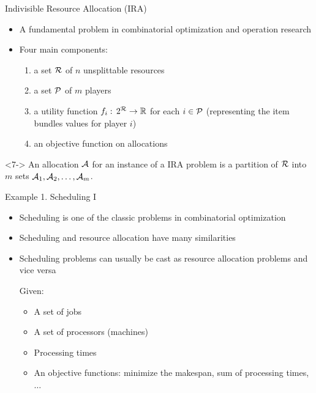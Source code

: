 \documentclass[10pt]{beamer}
\begin{document}
\begin{frame}{Indivisible Resource Allocation (IRA)}
\begin{itemize}
	\item<1-> A fundamental problem in combinatorial optimization and operation research	
	\item<2-> Four main components:
	\begin{enumerate}
		\item<3-> a set $\mathcal{R}$ of $n$ unsplittable resources
		\item<4-> a set $\mathcal{P}$ of $m$ players
		\item<5-> a \alert{utility} function $f_{i}: \, 2^{\mathcal{R}} \rightarrow \mathbb{R}$ for each $i \in \mathcal{P}$ (representing the item bundles values for player $i$)
		\item<6-> an objective function on \alert{allocations}
	\end{enumerate}
\end{itemize}
\begin{definition}[Allocation]<7->
An allocation $\mathcal{A}$ for an instance of a \textsc{IRA} problem is a partition of $\mathcal{R}$ into $m$ sets $\mathcal{A}_{1}, \mathcal{A}_{2}, \ldots, \mathcal{A}_{m}$.
\end{definition}
\end{frame}

\begin{frame}{Example 1. Scheduling I}
\begin{itemize}
	\item<1-> Scheduling is one of the classic problems in combinatorial optimization
	\item<3-> Scheduling and resource allocation have many similarities
	\item<4-> Scheduling problems can usually be cast as resource allocation problems and vice versa    
	\begin{example}
	    Given:
        \begin{itemize}
            \item<6-> A set of jobs
            \item<7-> A set of processors (machines)
            \item<8-> Processing times
            \item<9-> An objective functions: minimize the makespan, sum of processing times, $\ldots$
        \end{itemize}
    \end{example}
\end{itemize}
\end{frame}
\end{document}
